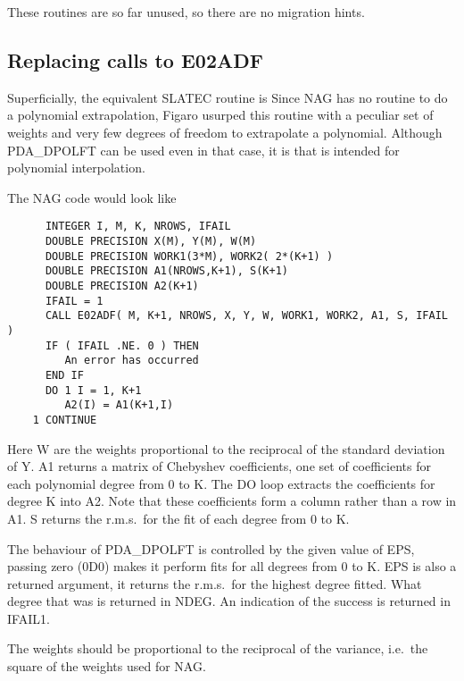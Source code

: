    These routines are so far unused, so there are no migration hints.


\subsection{\label{m_e02adf}Replacing calls to E02ADF}

   Superficially, the equivalent SLATEC routine is
   Since NAG
   has no routine to do a polynomial extrapolation,
   Figaro usurped this routine with a peculiar set of weights
   and very few degrees of freedom to extrapolate a polynomial. Although
   PDA\_DPOLFT can be used even in that case, it is
   that is
   intended for polynomial interpolation.

   The NAG code would look like

\begin{verbatim}
      INTEGER I, M, K, NROWS, IFAIL
      DOUBLE PRECISION X(M), Y(M), W(M)
      DOUBLE PRECISION WORK1(3*M), WORK2( 2*(K+1) )
      DOUBLE PRECISION A1(NROWS,K+1), S(K+1)
      DOUBLE PRECISION A2(K+1)
      IFAIL = 1
      CALL E02ADF( M, K+1, NROWS, X, Y, W, WORK1, WORK2, A1, S, IFAIL )
      IF ( IFAIL .NE. 0 ) THEN
         An error has occurred
      END IF
      DO 1 I = 1, K+1
         A2(I) = A1(K+1,I)
    1 CONTINUE
\end{verbatim}

   Here W are the weights proportional to the reciprocal of the standard
   deviation of Y. A1 returns a matrix of Chebyshev coefficients, one
   set of coefficients for each polynomial degree from 0 to K. The DO
   loop extracts the coefficients for degree K into A2. Note that these
   coefficients form a column rather than a row in A1. S returns the
   r.m.s.\ for the fit of each degree from 0 to K.

   The behaviour of PDA\_DPOLFT is controlled by the given value of EPS,
   passing zero (0D0) makes it perform fits for all degrees from 0 to K.
   EPS is also a returned argument, it returns the r.m.s.\ for
   the highest degree fitted. What degree that was is returned in NDEG.
   An indication of the success is returned in IFAIL1.

   The weights should be proportional to the reciprocal of the variance,
   i.e.\ the square of the weights used for NAG.

